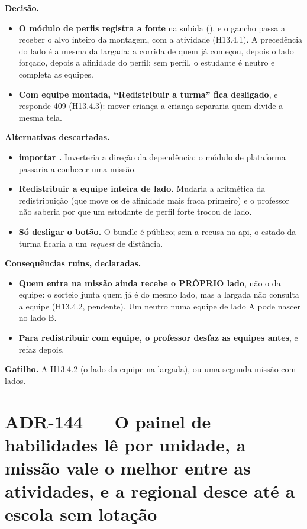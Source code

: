 \textbf{Decisão.}

\begin{itemize}
  \item \textbf{O módulo de perfis registra a fonte} na subida
    (), e o gancho passa a receber o alvo inteiro
    da montagem, com a atividade (H13.4.1). A precedência do lado é a mesma da
    largada: a corrida de quem já começou, depois o lado forçado, depois a
    afinidade do perfil; sem perfil, o estudante é neutro e completa as equipes.
  \item \textbf{Com equipe montada, \enquote{Redistribuir a turma} fica
    desligado}, e  responde 409
     (H13.4.3): mover criança a criança separaria quem
    divide a mesma tela.
\end{itemize}

\textbf{Alternativas descartadas.}

\begin{itemize}
  \item \textbf{ importar .} Inverteria a direção da
    dependência: o módulo de plataforma passaria a conhecer uma missão.
  \item \textbf{Redistribuir a equipe inteira de lado.} Mudaria a aritmética da
    redistribuição (que move os de afinidade mais fraca primeiro) e o professor
    não saberia por que um estudante de perfil forte trocou de lado.
  \item \textbf{Só desligar o botão.} O bundle é público; sem a recusa na api, o
    estado da turma ficaria a um \emph{request} de distância.
\end{itemize}

\textbf{Consequências ruins, declaradas.}

\begin{itemize}
  \item \textbf{Quem entra na missão ainda recebe o PRÓPRIO lado}, não o da
    equipe: o sorteio junta quem já é do mesmo lado, mas a largada não consulta
    a equipe (H13.4.2, pendente). Um neutro numa equipe de lado A pode nascer
    no lado B.
  \item \textbf{Para redistribuir com equipe, o professor desfaz as equipes
    antes}, e refaz depois.
\end{itemize}

\textbf{Gatilho.} A H13.4.2 (o lado da equipe na largada), ou uma segunda missão
com lados.

\section{ADR-144 --- O painel de habilidades lê por unidade, a missão vale o melhor entre as atividades, e a regional desce até a escola sem lotação}
\label{adr:painel-de-habilidades}

